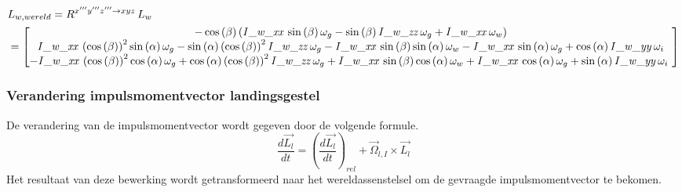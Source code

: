 \begin{align*}
&L_{w,wereld}=R^{x'''y'''z''' \rightarrow xyz}\,L_{w}\\
&=\begin{bmatrix}
-\cos \left( \beta \right)  \left( {\it I\_w\_xx}\,\sin \left( \beta \right) \omega_{g}-\sin \left( \beta\right) {\it I\_w\_zz}\,\omega_{g}+{\it I\_w\_xx}\,\omega_{w}
\right)
\\ 
{\it I\_w\_xx}\, \left( \cos \left( \beta \right)  \right) ^{2}\sin \left( \alpha \right) \omega_{g}-\sin\left( \alpha \right)  \left( \cos \left( \beta \right)  \right) ^{2}
{\it I\_w\_zz}\,\omega_{g}-{\it I\_w\_xx}\,\sin \left( \beta \right) \sin \left( \alpha \right) \omega_{w}-{\it I\_w\_xx}\,\sin \left( \alpha \right) \omega_{g}+\cos \left( \alpha \right) {\it I\_w\_yy}\,\omega_{i}
\\ 
-{\it I\_w\_xx}\, \left( \cos \left( \beta \right)  \right) ^{2}\cos \left( \alpha \right) \omega_{g}+\cos\left( \alpha \right)  \left( \cos \left( \beta \right)  \right) ^{2}
{\it I\_w\_zz}\,\omega_{g}+{\it I\_w\_xx}\,\sin \left( \beta \right) \cos \left( \alpha \right) \omega_{w}+{\it I\_w\_xx}\,\cos \left( \alpha \right) \omega_{g}+\sin \left( \alpha \right) {\it I\_w\_yy}\,\omega_{i}\
\end{bmatrix}
\end{align*}

\subsubsection{Verandering impulsmomentvector landingsgestel}
De verandering van de impulsmomentvector wordt gegeven door de volgende formule. 
\begin{equation}
\frac{d\overrightarrow{L_{l}}}{dt}=\left(\frac{d\overrightarrow{L_{l}}}{dt}\right)_{rel}+\overrightarrow{\Omega}_{l,I}\times \overrightarrow{L_{l}}
\end{equation}
Het resultaat van deze bewerking wordt getransformeerd naar het wereldassenstelsel om de gevraagde impulsmomentvector te bekomen.

